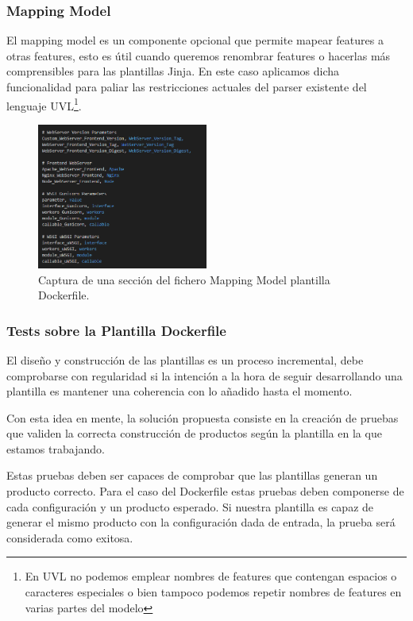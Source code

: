 \documentclass[12pt, a4paper, twoside]{article}
\begin{document}
\subsubsection{Mapping Model}
El mapping model es un componente opcional que permite mapear features a otras features, esto es útil cuando queremos renombrar features o hacerlas más comprensibles para las plantillas Jinja.
En este caso aplicamos dicha funcionalidad para paliar las restricciones actuales del parser existente del lenguaje UVL\footnote{En UVL no podemos emplear nombres de features que contengan espacios o caracteres especiales o bien tampoco podemos repetir nombres de features en varias partes del modelo}.
\begin{figure}[h]
	\centering
	  \includegraphics[width=0.5\textwidth]{mapping_model_screenshot.png}
	\caption{Captura de una sección del fichero Mapping Model plantilla Dockerfile.}
\end{figure}

\newpage

\subsubsection{Tests sobre la Plantilla Dockerfile}
El diseño y construcción de las plantillas es un proceso incremental, debe comprobarse con regularidad si la intención a la hora de seguir desarrollando una plantilla es mantener una coherencia con lo añadido hasta el momento. 

Con esta idea en mente, la solución propuesta consiste en la creación de pruebas que validen la correcta construcción de productos según la plantilla en la que estamos trabajando.

Estas pruebas deben ser capaces de comprobar que las plantillas generan un producto correcto. Para el caso del Dockerfile estas pruebas deben componerse de cada configuración y un producto esperado. Si nuestra plantilla es capaz de generar el mismo producto con la configuración dada de entrada, la prueba será considerada como exitosa. 
\end{document}

